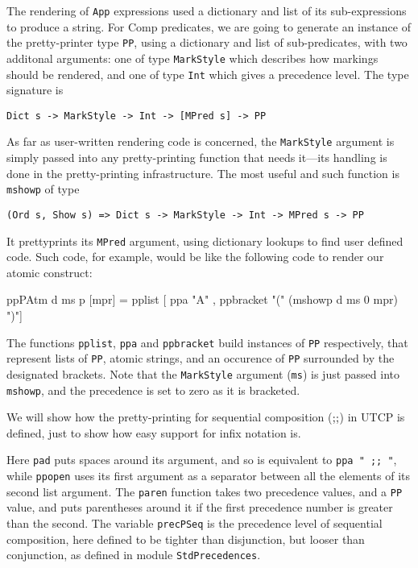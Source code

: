 The rendering of \texttt{App} expressions used a dictionary and list of its
sub-expressions to produce a string.
For Comp predicates, we are going to generate an instance
of the pretty-printer type \texttt{PP}, using a dictionary
and list of sub-predicates,
with two additonal arguments:
one of type \texttt{MarkStyle} which describes how markings should be rendered,
and one of type \texttt{Int} which gives a precedence level.
The type signature is
\begin{verbatim}
Dict s -> MarkStyle -> Int -> [MPred s] -> PP
\end{verbatim}
As far as user-written rendering code is concerned,
the \texttt{MarkStyle} argument is simply passed into any pretty-printing
function that needs it---its handling is done in the pretty-printing
infrastructure.
The most useful and such function is \texttt{mshowp} of type
\begin{verbatim}
(Ord s, Show s) => Dict s -> MarkStyle -> Int -> MPred s -> PP
\end{verbatim}
It prettyprints its \texttt{MPred} argument, using dictionary lookups
to find user defined code.
Such code, for example, would be like the following code
to render our atomic construct:
\begin{code}
ppPAtm d ms p [mpr]
 = pplist [ ppa "A"
          , ppbracket "(" (mshowp d ms 0 mpr) ")"]
\end{code}
The functions \texttt{pplist}, \texttt{ppa} and \texttt{ppbracket}
build instances of \texttt{PP} respectively,
that represent lists of \texttt{PP},
atomic strings,
and an occurence of \texttt{PP} surrounded by the designated brackets.
Note that the \texttt{MarkStyle} argument (\texttt{ms})
is just passed into \texttt{mshowp},
and the precedence is set to zero as it is bracketed.



We will show how the pretty-printing for
sequential composition  ($\mathrel{\mathbf{;\!;}}$) in UTCP is defined,
just to show how easy support for infix notation is.
Here \texttt{pad} puts spaces around its argument,
and so is equivalent to \verb$ppa " ;; "$,
while \texttt{ppopen} uses its first argument as a
separator between all the elements of its second list argument.
The \texttt{paren} function takes two precedence values,
and a \texttt{PP} value, and puts parentheses around it if the first precedence
number is greater than the second.
The variable \texttt{precPSeq} is the precedence level of sequential composition,
here defined to be tighter than disjunction,
but looser than conjunction, as defined in module \texttt{StdPrecedences}.

